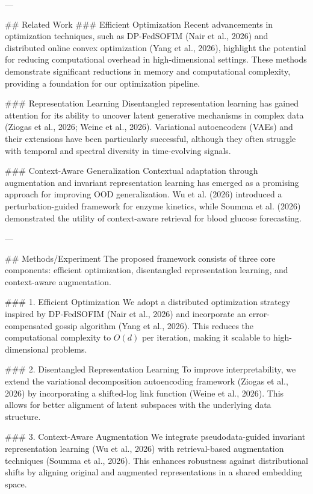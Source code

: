 ---

## Related Work
### Efficient Optimization
Recent advancements in optimization techniques, such as DP-FedSOFIM (Nair et al., 2026) and distributed online convex optimization (Yang et al., 2026), highlight the potential for reducing computational overhead in high-dimensional settings. These methods demonstrate significant reductions in memory and computational complexity, providing a foundation for our optimization pipeline.

### Representation Learning
Disentangled representation learning has gained attention for its ability to uncover latent generative mechanisms in complex data (Ziogas et al., 2026; Weine et al., 2026). Variational autoencoders (VAEs) and their extensions have been particularly successful, although they often struggle with temporal and spectral diversity in time-evolving signals.

### Context-Aware Generalization
Contextual adaptation through augmentation and invariant representation learning has emerged as a promising approach for improving OOD generalization. Wu et al. (2026) introduced a perturbation-guided framework for enzyme kinetics, while Soumma et al. (2026) demonstrated the utility of context-aware retrieval for blood glucose forecasting.

---

## Methods/Experiment
The proposed framework consists of three core components: efficient optimization, disentangled representation learning, and context-aware augmentation.

### 1. Efficient Optimization
We adopt a distributed optimization strategy inspired by DP-FedSOFIM (Nair et al., 2026) and incorporate an error-compensated gossip algorithm (Yang et al., 2026). This reduces the computational complexity to \( O(d) \) per iteration, making it scalable to high-dimensional problems.

### 2. Disentangled Representation Learning
To improve interpretability, we extend the variational decomposition autoencoding framework (Ziogas et al., 2026) by incorporating a shifted-log link function (Weine et al., 2026). This allows for better alignment of latent subspaces with the underlying data structure.

### 3. Context-Aware Augmentation
We integrate pseudodata-guided invariant representation learning (Wu et al., 2026) with retrieval-based augmentation techniques (Soumma et al., 2026). This enhances robustness against distributional shifts by aligning original and augmented representations in a shared embedding space.

